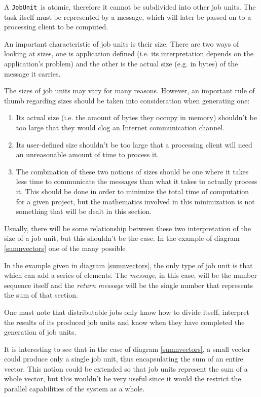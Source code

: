 \documentclass[a4paper,12pt,english]{report}
\newcommand{\JU}{\texttt{JobUnit}}
\begin{document}
A \JU \ is atomic, therefore it cannot be subdivided into other job units. The task itself must be represented by a message, which will later be passed on to a processing client to be computed. 

An important characteristic of job units is their size. There are two ways of looking at sizes, one is application defined (i.e. its interpretation depends on the application's problem) and the other is the actual size (e.g. in bytes) of the message it carries.

The sizes of job units may vary for many reasons. However, an important rule of thumb regarding sizes should be taken into consideration when generating one:
\begin{enumerate}
 \item Its actual size (i.e. the amount of bytes they occupy in memory) shouldn't be too large that they would clog an Internet communication channel.
 \item Its user-defined size shouldn't be too large that a processing client will need an unreasonable amount of time to process it.
 \item The combination of these two notions of sizes should be one where it takes less time to communicate the messages than what it takes to actually process it. This should be done in order to minimize the total time of computation for a given project, but the mathematics involved in this minimization is not something that will be dealt in this section.
\end{enumerate}

Usually, there will be some relationship between these two interpretation of the size of a job unit, but this shouldn't be the case. In the example of diagram \ref{sumnvectors} one of the many possible 

In the example given in diagram \ref{sumnvectors}, the only type of job unit is that which can add a series of elements. The \emph{message}, in this case, will be the number sequence itself and the \emph{return message} will be the single number that represents the sum of that section.

One must note that distributable jobs only know how to divide itself, interpret the results of its produced job units and know when they have completed the generation of job units. 

It is interesting to see that in the case of diagram \ref{sumnvectors}, a small vector could produce only a single job unit, thus encapsulating the sum of an entire vector. This notion could be extended so that job units represent the sum of a whole vector, but this wouldn't be very useful since it would the restrict the parallel capabilities of the system as a whole.
\end{document}
